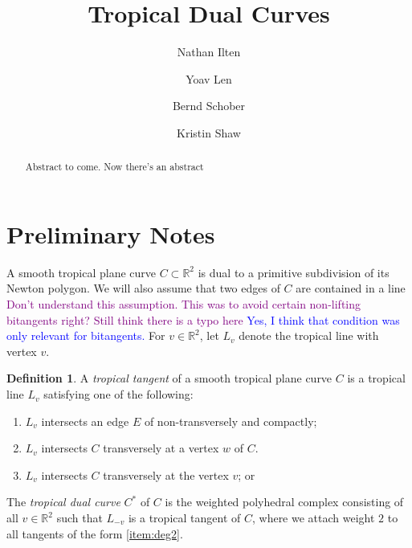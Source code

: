 \documentclass[oneside]{amsart}
\title{Tropical Dual Curves}
\author{Nathan Ilten}
\author{Yoav Len}
\author{Bernd Schober}
\author{Kristin Shaw}
\newcommand{\RR}{\mathbb{R}}
\theoremstyle{definition}
\newtheorem{defn}[thm]{Definition}
\newcommand{\yoav}[1]{\textcolor{blue}{#1}}
\newcommand{\kristin}[1]{\textcolor{purple}{#1}}
\begin{document}
\begin{abstract}
Abstract to come. Now there's an abstract
\end{abstract}
\maketitle
\section{Preliminary Notes}
A smooth tropical plane curve $C\subset \mathbb{R}^2$ is dual to a primitive
subdivision of its Newton polygon. We will also assume that  two edges  of $C$
are contained in a line  \kristin{Don't understand this assumption. This was to
avoid certain non-lifting bitangents right?
Still think there is a typo here} \yoav{Yes, I think that condition was only relevant for bitangents.} For $v\in\RR^2$, let
$L_v$ denote the tropical line with vertex $v$.

\begin{defn}
A \emph{tropical tangent} of a smooth tropical plane curve $C$ is a tropical line $L_v$ satisfying one of the following:
\begin{enumerate}
\item \label{item:deg2} $L_v$ intersects an edge $E$ of non-transversely and compactly;
\item $L_v$ intersects $C$ transversely at a vertex $w$ of $C$. \label{item:tan2}
\item $L_v$ intersects $C$ transversely at the vertex $v$; or \label{item:tan3}
\end{enumerate}
\end{defn}

The \emph{tropical dual curve} $C^*$ of $C$ is the weighted polyhedral complex consisting of all $v\in\RR^2$ such that $L_{-v}$ is a tropical tangent of $C$, where we attach weight $2$ to all tangents of the form \ref{item:deg2}.
\end{document}
